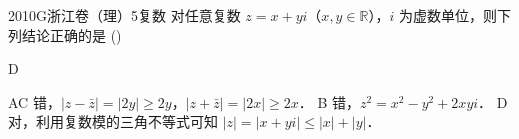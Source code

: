 
\begin{problem}{2010}{G}{浙江卷（理）}{5}{复数}
对任意复数 $ z=x+yi $（$ x,y\in\mathbb{R} $），$ i $ 为虚数单位，则下列结论正确的是 (\hspace{1cm})
\begin{choices}
\end{choices}
\end{problem}

\begin{answer}
D
\end{answer}

\begin{solutions}
AC 错，$ |z-\bar{z}|=|2y|\geqslant 2y $，$ |z+\bar{z}|=|2x|\geqslant 2x $．  
B 错，$ z^2=x^2-y^2+2xyi $．  
D 对，利用复数模的三角不等式可知 $ |z|=|x+yi|\leqslant |x|+|y| $．
\end{solutions}